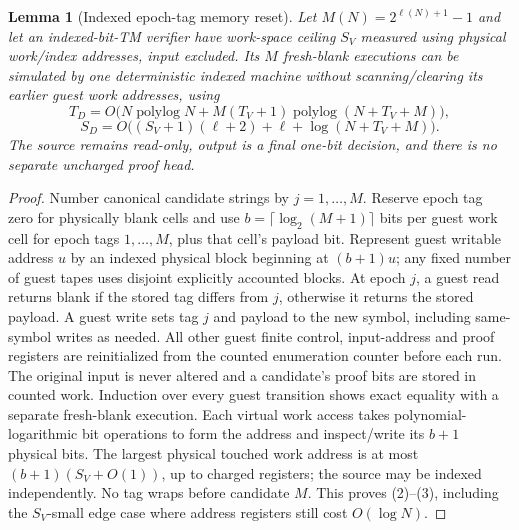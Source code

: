 \documentclass[11pt]{article}
\newtheorem{lemma}[theorem]{Lemma}
\begin{document}
\begin{lemma}[Indexed epoch-tag memory reset]\label{le:epoch}
Let $M(N)=2^{\ell(N)+1}-1$ and let an indexed-bit-TM
verifier have work-space ceiling $S_V$ measured using
physical work/index addresses, input excluded. Its $M$ fresh-blank
executions can be simulated by one deterministic indexed machine
without scanning/clearing its earlier guest work addresses, using
\[
T_D=O\bigl(N\operatorname{polylog}N+
M(T_V+1)\operatorname{polylog}(N+T_V+M)\bigr),\tag{2}
\]
\[
S_D=O\bigl((S_V+1)(\ell+2)+\ell+\log(N+T_V+M)\bigr).\tag{3}
\]
The source remains read-only, output is a final one-bit decision,
and there is no separate uncharged proof head.
\end{lemma}
\begin{proof}
Number canonical candidate strings by $j=1,\ldots,M$.
Reserve epoch tag zero for physically blank cells and use
$b=\lceil\log_2(M+1)\rceil$ bits per guest work cell for epoch
tags $1,\ldots,M$, plus that cell's payload bit.
Represent guest writable address $u$ by an indexed physical
block beginning at $(b+1)u$; any fixed number of guest tapes
uses disjoint explicitly accounted blocks. At epoch $j$,
a guest read returns blank if the stored tag differs from $j$,
otherwise it returns the stored payload. A guest write
sets tag $j$ and payload to the new symbol, including
same-symbol writes as needed. All other guest finite control,
input-address and proof registers are reinitialized from
the counted enumeration counter before each run. The
original input is never altered and a candidate's proof bits
are stored in counted work. Induction over every guest
transition shows exact equality with a separate fresh-blank
execution. Each virtual work access takes polynomial-logarithmic
bit operations to form the address and inspect/write its
$b+1$ physical bits. The largest physical touched work
address is at most $(b+1)(S_V+O(1))$, up to
charged registers; the source may be indexed independently.
No tag wraps before candidate $M$. This proves (2)--(3),
including the $S_V$-small edge case where address registers
still cost $O(\log N)$.
\end{proof}
\end{document}
